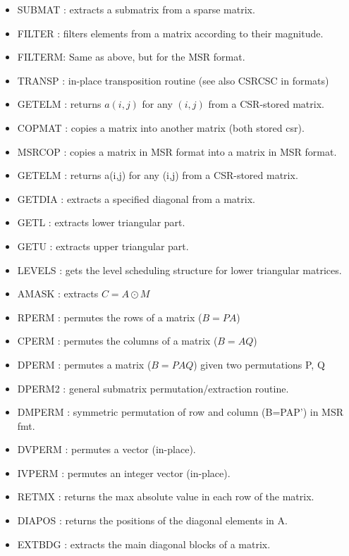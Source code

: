 \begin{itemize} 

\item SUBMAT : extracts a submatrix from a sparse matrix.                  
\item FILTER : filters elements from a matrix according to their magnitude.
\item FILTERM: Same as above, but for the MSR format.
\item TRANSP : in-place transposition routine (see also CSRCSC in formats) 
\item GETELM : returns $a(i,j)$ for any $(i,j)$	 from a CSR-stored matrix.
\item COPMAT : copies a matrix into another matrix (both stored csr).
\item MSRCOP : copies a matrix in MSR format into a matrix in MSR format.
\item GETELM : returns a(i,j) for any (i,j) from a CSR-stored matrix.
\item GETDIA : extracts a specified diagonal from a matrix.                
\item GETL   : extracts lower triangular part.
\item GETU   : extracts upper triangular part.                             
\item LEVELS : gets the level scheduling structure for lower triangular    
 matrices.                                                   
\item AMASK  : extracts  $C = A \odot  M $
\item RPERM  : permutes the rows of a matrix ($B = P A$)                     
\item CPERM  : permutes the columns of a matrix ($B = A Q$)                  
\item DPERM  : permutes a matrix ($B = P A Q$) given two permutations P, Q   
\item DPERM2 : general submatrix permutation/extraction routine.
\item DMPERM : symmetric permutation of row and column (B=PAP') in MSR fmt.
\item DVPERM : permutes a vector (in-place).                                
\item IVPERM : permutes an integer vector (in-place).
\item RETMX  : returns the max absolute value in each row of the matrix.
\item DIAPOS : returns the positions of the diagonal elements in A.
\item EXTBDG : extracts the main diagonal blocks of a matrix.   

\end{itemize}
